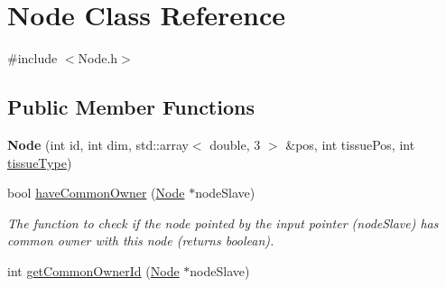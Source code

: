 \hypertarget{classNode}{}\section{Node Class Reference}
\label{classNode}


{\ttfamily \#include $<$Node.\+h$>$}

\subsection*{Public Member Functions}
\begin{DoxyCompactItemize}
\item 
\hypertarget{classNode_af90d470ff04c571a16cd56a7061100ff}{}{\bfseries Node} (int id, int dim, std\+::array$<$ double, 3 $>$ \&pos, int tissue\+Pos, int \hyperlink{classNode_ae621097f98f1d33d283cf65a0a02d29a}{tissue\+Type})\label{classNode_af90d470ff04c571a16cd56a7061100ff}

\item 
\hypertarget{classNode_ab165125d2f0e60b9030468a4152c3ccb}{}bool \hyperlink{classNode_ab165125d2f0e60b9030468a4152c3ccb}{have\+Common\+Owner} (\hyperlink{classNode}{Node} $\ast$node\+Slave)\label{classNode_ab165125d2f0e60b9030468a4152c3ccb}

\begin{DoxyCompactList}\small\item\em The function to check if the node pointed by the input pointer (node\+Slave) has common owner with this node (returns boolean). \end{DoxyCompactList}\item 
\hypertarget{classNode_a52d23c3e39f6de623ed0aad9bc225c14}{}int \hyperlink{classNode_a52d23c3e39f6de623ed0aad9bc225c14}{get\+Common\+Owner\+Id} (\hyperlink{classNode}{Node} $\ast$node\+Slave)\label{classNode_a52d23c3e39f6de623ed0aad9bc225c14}


\end{DoxyCompactItemize}
